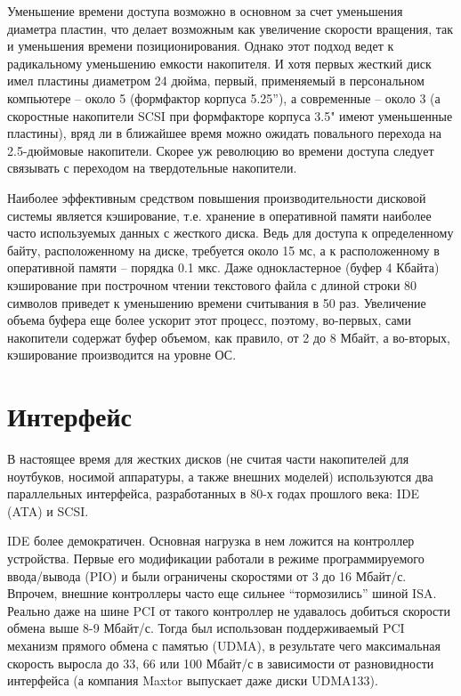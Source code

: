 \documentclass[bachelor, och, referat]{SCWorks}
\begin{document}
Уменьшение времени доступа возможно в основном за счет уменьшения диаметра пластин, что делает возможным как увеличение скорости вращения, так и уменьшения времени позиционирования. Однако этот подход ведет к радикальному уменьшению емкости накопителя. И хотя первых жесткий диск имел пластины диаметром 24 дюйма, первый, применяемый в персональном компьютере – около 5 (формфактор корпуса 5.25”), а современные – около 3 (а скоростные накопители SCSI при формфакторе корпуса 3.5" имеют уменьшенные пластины), вряд ли в ближайшее время можно ожидать повального перехода на 2.5-дюймовые накопители. Скорее уж революцию во времени доступа следует связывать с переходом на твердотельные накопители.

Наиболее эффективным средством повышения производительности дисковой системы является кэширование, т.е. хранение в оперативной памяти наиболее часто используемых данных с жесткого диска. Ведь для доступа к определенному байту, расположенному на диске, требуется около 15 мс, а к расположенному в оперативной памяти -- порядка 0.1 мкс. Даже однокластерное (буфер 4 Кбайта) кэширование при построчном чтении текстового файла с длиной строки 80 символов приведет к уменьшению времени считывания в 50 раз. Увеличение объема буфера еще более ускорит этот процесс, поэтому, во-первых, сами накопители содержат буфер объемом, как правило, от 2 до 8 Мбайт, а во-вторых, кэширование производится на уровне ОС.


\section{Интерфейс}

В настоящее время для жестких дисков (не считая части накопителей для ноутбуков, носимой аппаратуры, а также внешних моделей) используются два параллельных интерфейса, разработанных в 80-х годах прошлого века: IDE (ATA) и SCSI.

IDE более демократичен. Основная нагрузка в нем ложится на контроллер устройства. Первые его модификации работали в режиме программируемого ввода/вывода (PIO) и были ограничены скоростями от 3 до 16 Мбайт/с. Впрочем, внешние контроллеры часто еще сильнее ``тормозились'' шиной ISA. Реально даже на шине PCI от такого контроллер не удавалось добиться скорости обмена выше 8-9 Мбайт/с. Тогда был использован поддерживаемый PCI механизм прямого обмена с памятью (UDMA), в результате чего максимальная скорость выросла до 33, 66 или 100 Мбайт/с в зависимости от разновидности интерфейса (а компания Maxtor выпускает даже диски UDMA133).
\end{document}
